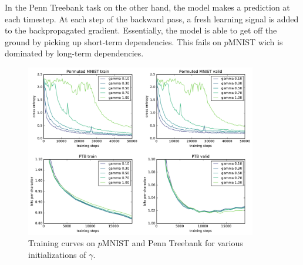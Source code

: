 \documentclass{article} %
\begin{document}
In the Penn Treebank task on the other hand, the model makes a prediction at each timestep.
At each step of the backward pass, a fresh learning signal is added to the backpropagated gradient.
Essentially, the model is able to get off the ground by picking up short-term dependencies.
This fails on $p$MNIST wich is dominated by long-term dependencies.~\cite{urnn}

\begin{figure}%
\center
\includegraphics[width=0.9\textwidth]{figures/gammas.pdf}
\caption{Training curves on $p$MNIST and Penn Treebank for various initializations of $\gamma$.}
\label{fig:gammas}
\end{figure}
\end{document}
